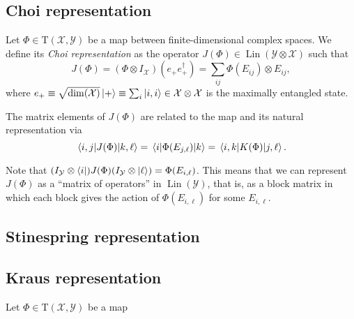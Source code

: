 \documentclass[12pt]{report}
\newcommand{\calY}{{\mathcal{Y}}}
\newcommand{\calX}{{\mathcal{X}}}
\newcommand{\rmT}{{\mathrm{T}}}
\DeclareMathOperator{\Lin}{Lin}
\begin{document}
\subsection{Choi representation}

\begin{defn}
	Let $\Phi\in\rmT(\calX,\calY)$ be a map between finite-dimensional complex spaces.
	We define its \emph{Choi representation} as the operator $J(\Phi)\in\Lin(\calY\otimes\calX)$ such that
	\begin{equation}
		J(\Phi) = (\Phi\otimes I_{\calX})(e_+ e_+^\dagger)
		= \sum_{ij} \Phi(E_{ij})\otimes E_{ij},
	\end{equation}
	where $e_+\equiv \sqrt{\dim(\calX)}\ket+\equiv \sum_i \ket{i,i}\in\calX\otimes\calX$ is the maximally entangled state.
\end{defn}

\begin{prop}
	The matrix elements of $J(\Phi)$ are related to the map and its natural representation via
	\begin{equation}
		\mel{i,j}{J(\Phi)}{k,\ell}
		= \mel{i}{\Phi(E_{j,\ell})}{k}
		= \mel{i,k}{K(\Phi)}{j,\ell}.
	\end{equation}
\end{prop}

Note that $(I_{\calY}\otimes\bra i)J(\Phi)(I_{\calY}\otimes\ket \ell) = \Phi(E_{i,\ell})$.
This means that we can represent $J(\Phi)$ as a ``matrix of operators'' in $\Lin(\calY)$, that is, as a block matrix in which each block gives the action of $\Phi(E_{i,\ell})$ for some $E_{i,\ell}$.



\subsection{Stinespring representation}

\subsection{Kraus representation}

\begin{prop}
	Let $\Phi\in\rmT(\calX,\calY)$ be a map 
\end{prop}
\end{document}
